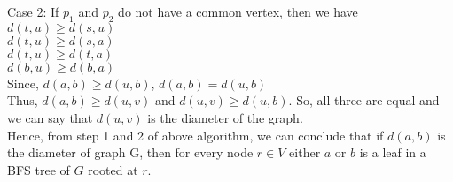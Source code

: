 \documentclass[12pt]{article}
\begin{document}
\begin{enumerate}
\begin{enumerate}
Case 2: If $p_1$ and $p_2$ do not have a common vertex, then we have\\
$d(t,u) \ge d(s,u)$\\
$d(t,u) \ge d(s,a)$\\
$d(t,u) \ge d(t,a)$\\
$d(b,u) \ge d(b,a)$\\
Since, $d(a,b) \ge d(u,b)$, $d(a,b) = d(u,b)$\\
Thus, $d(a,b) \ge d(u,v)$ and $d(u,v) \ge d(u,b)$. So, all three are equal and we can say that $d(u,v)$ is the diameter of the graph.\\
Hence, from step 1 and 2 of above algorithm, we can conclude that if $d(a,b)$ is the diameter of graph G, then for every node $r\in V$ either $a$ or $b$ is a leaf in a BFS tree of $G$ rooted at $r$. \\


\end{enumerate}
\end{enumerate}
\end{document}
